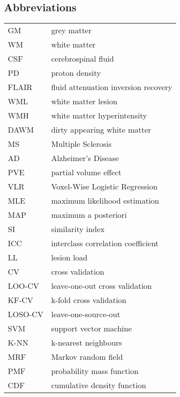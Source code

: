 \begin{singlespacing}
\tableofcontents
\newpage
\listoffigures
\newpage
\listoftables
\newpage
\subsection*{Abbreviations}
\begin{table}[H]
  \begin{tabular}{ll}
  	\toprule
  	GM      & grey matter                          \\
  	WM      & white matter                         \\
  	CSF     & cerebrospinal fluid                  \\
  	PD      & proton density                       \\
  	FLAIR   & fluid attenuation inversion recovery \\
  	WML     & white matter lesion                  \\
  	WMH     & white matter hyperintensity          \\
  	DAWM    & dirty appearing white matter         \\
  	MS      & Multiple Sclerosis                   \\
  	AD      & Alzheimer's Disease                  \\
  	PVE     & partial volume effect                \\
  	VLR     & Voxel-Wise Logistic Regression       \\
  	MLE     & maximum likelihood estimation        \\
  	MAP     & maximum a posteriori                 \\
  	SI      & similarity index                     \\
  	ICC     & interclass correlation coefficient   \\
  	LL      & lesion load                          \\
  	CV      & cross validation                     \\
  	LOO-CV  & leave-one-out cross validation       \\
  	KF-CV   & k-fold cross validation              \\
  	LOSO-CV & leave-one-source-out                 \\
  	SVM     & support vector machine               \\
  	K-NN    & k-nearest neighbours                 \\
  	MRF     & Markov random field                  \\
    PMF     & probability mass function            \\
    CDF     & cumulative density function          \\ \bottomrule
  \end{tabular}
\end{table}
\clearpage

\end{singlespacing}
